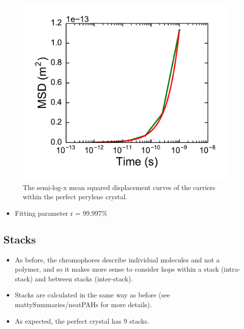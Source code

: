 \documentclass[12pt]{article}
\begin{document}
\begin{figure}[h!]\centering
	\includegraphics[width=\textwidth]{Figures/SemiLogMSDHole.pdf}
    \caption{The semi-log-x mean squared displacement curves of the carriers within the perfect perylene crystal.}
	\label{fig:MSD}
\end{figure}

\begin{itemize}
    \item{Fitting parameter r = 99.997\%}
\end{itemize}

\clearpage

\subsection{Stacks}

\begin{itemize}
    \item{As before, the chromophores describe individual molecules and not a polymer, and so it makes more sense to consider hops within a stack (intra-stack) and between stacks (inter-stack).}
    \item{Stacks are calculated in the same way as before (see mattySummaries/neatPAHs for more details).}
    \item{As expected, the perfect crystal has 9 stacks.}
\end{itemize}
\end{document}
